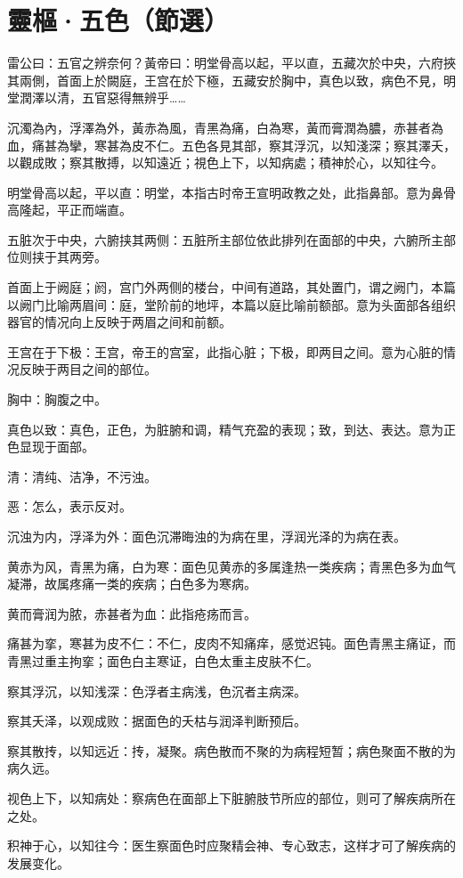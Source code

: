 \documentclass[12pt]{ctexbook}
\begin{document}
\section{靈樞·五色（節選）}%


\begin{yuanwen}
雷公曰：五官之辨奈何？黃帝曰：明堂骨高以起，平以直，五藏次於中央，六府挾其兩側，首面上於闕庭，王宫在於下極，五藏安於胸中，真色以致，病色不見，明堂潤澤以清，五官惡得無辨乎……

沉濁為內，浮澤為外，黃赤為風，青黑為痛，白為寒，黃而膏潤為膿，赤甚者為血，痛甚為攣，寒甚為皮不仁。五色各見其部，察其浮沉，以知淺深；察其澤夭，以觀成敗；察其散搏，以知遠近；視色上下，以知病處；積神於心，以知往今。
\end{yuanwen}


\begin{jiaozhu}
  \item 明堂骨高以起，平以直：明堂，本指古时帝王宣明政教之处，此指鼻部。意为鼻骨高隆起，平正而端直。
  \item 五脏次于中央，六腑挟其两侧：五脏所主部位依此排列在面部的中央，六腑所主部位则挟于其两旁。
  \item 首面上于阙庭；阏，宫门外两侧的楼台，中间有道路，其处置门，谓之阙门，本篇以阙门比喻两眉间：庭，堂阶前的地坪，本篇以庭比喻前额部。意为头面部各组织器官的情况向上反映于两眉之间和前额。
  \item 王宫在于下极：王宫，帝王的宫室，此指心脏；下极，即两目之间。意为心脏的情况反映于两目之间的部位。
  \item 胸中：胸腹之中。
  \item 真色以致：真色，正色，为脏腑和调，精气充盈的表现；致，到达、表达。意为正色显现于面部。
  \item 清：清纯、洁净，不污浊。
  \item 恶：怎么，表示反对。
  \item 沉浊为内，浮泽为外：面色沉滞晦浊的为病在里，浮润光泽的为病在表。
  \item 黄赤为风，青黑为痛，白为寒：面色见黄赤的多属逢热一类疾病；青黑色多为血气凝滞，故属疼痛一类的疾病；白色多为寒病。
  \item 黄而膏润为脓，赤甚者为血：此指疮疡而言。
  \item 痛甚为挛，寒甚为皮不仁：不仁，皮肉不知痛痒，感觉迟钝。面色青黑主痛证，而青黑过重主拘挛；面色白主寒证，白色太重主皮肤不仁。
  \item 察其浮沉，以知浅深：色浮者主病浅，色沉者主病深。
  \item 察其夭泽，以观成败：据面色的夭枯与润泽判断预后。
  \item 察其散抟，以知远近：抟，凝聚。病色散而不聚的为病程短暂；病色聚面不散的为病久远。
  \item 视色上下，以知病处：察病色在面部上下脏腑肢节所应的部位，则可了解疾病所在之处。
  \item 积神于心，以知往今：医生察面色时应聚精会神、专心致志，这样才可了解疾病的发展变化。
\end{jiaozhu}
\end{document}
